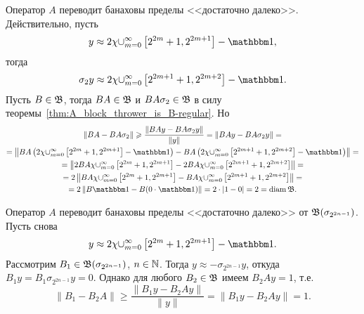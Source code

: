 \begin{remark}
	Оператор $A$ переводит банаховы пределы <<достаточно далеко>>. Действительно, пусть
	\begin{equation}
		y \approx 2\chi {\cup_{m=0}^{\infty}\left[2^{2 m}+1, 2^{2 m+1}\right]} - \one
		,
	\end{equation}
	тогда
	\begin{equation}
		\sigma_2 y \approx 2\chi {\cup_{m=0}^{\infty}\left[2^{2 m+1}+1, 2^{2 m+2}\right]} - \one
		.
	\end{equation}
	Пусть $B\in\mathfrak{B}$, тогда $BA\in\mathfrak{B}$ и $BA\sigma_2\in\mathfrak{B}$ в силу теоремы~\ref{thm:A_block_thrower_is_B-regular}.
	Но
	\begin{multline}
		\|BA-BA\sigma_2\| \geq \dfrac{\| BAy-BA\sigma_2y \|}{\|y\|} = \| BAy-BA\sigma_2y \| =
		\\=
		\left\| BA\left(2\chi {\cup_{m=0}^{\infty}\left[2^{2 m}+1, 2^{2 m+1}\right]} - \one\right)-
		BA\left(2\chi {\cup_{m=0}^{\infty}\left[2^{2 m+1}+1, 2^{2 m+2}\right]} - \one\right) \right\|=
		\\=
		\left\| 2BA\chi {\cup_{m=0}^{\infty}\left[2^{2 m}+1, 2^{2 m+1}\right]}-
		2BA\chi {\cup_{m=0}^{\infty}\left[2^{2 m+1}+1, 2^{2 m+2}\right]}  \right\|=
		\\=
		2\left\| BA\chi {\cup_{m=0}^{\infty}\left[2^{2 m}+1, 2^{2 m+1}\right]}-
		BA\chi {\cup_{m=0}^{\infty}\left[2^{2 m+1}+1, 2^{2 m+2}\right]}  \right\|=
		\\=
		2\left\| B \one- B (0\cdot \one)  \right\|=
		2\cdot| 1- 0  |= 2 = \diam \B
		.
		\end{multline}
\end{remark}

\begin{remark}
	Оператор $A$ переводит банаховы пределы <<достаточно далеко>> от $\mathfrak{B}(\sigma_{2^{2n-1}})$.
	Пусть снова
	\begin{equation}
		y \approx 2\chi {\cup_{m=0}^{\infty}\left[2^{2 m}+1, 2^{2 m+1}\right]} - \one
		.
	\end{equation}
	Рассмотрим $B_1 \in \mathfrak{B}(\sigma_{2^{2n-1}})$, $n\in\mathbb{N}$.
	Тогда  $y \approx - \sigma_{2^{2n-1}} y$,
	откуда $B_1 y = B_1 \sigma_{2^{2n-1}} y = 0$.
	Однако для любого $B_2 \in \mathfrak{B}$ имеем $B_2 A y = 1$,
	т.е.
	\begin{equation}
		\|B_1 - B_2 A\| \geq \dfrac{\|B_1y - B_2 Ay\|}{\|y\|} = \|B_1y - B_2 Ay\| = 1
		.
	\end{equation}
\end{remark}

